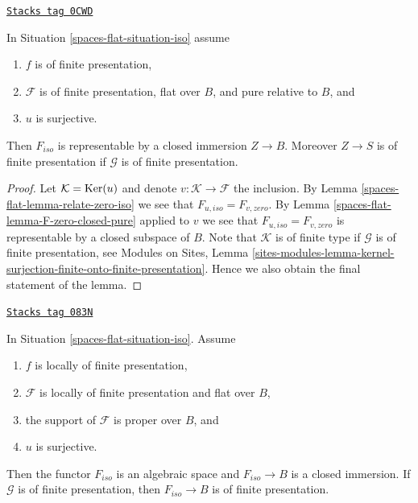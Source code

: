\begin{theorem}
\label{spaces-flat-theorem-flattening-map}
\href{https://stacks.math.columbia.edu/tag/0CWD}{\texttt{Stacks tag 0CWD}}

In Situation \ref{spaces-flat-situation-iso} assume
\begin{enumerate}
\item $f$ is of finite presentation,
\item $\mathcal{F}$ is of finite presentation, flat over $B$, and
pure relative to $B$, and
\item $u$ is surjective.
\end{enumerate}
Then $F_{iso}$ is representable by a closed immersion $Z \to B$.
Moreover $Z \to S$ is of finite presentation if $\mathcal{G}$ is
of finite presentation.
\end{theorem}

\begin{proof}
Let $\mathcal{K} = \operatorname{Ker}(u)$ and denote $v : \mathcal{K} \to \mathcal{F}$
the inclusion. By Lemma \ref{spaces-flat-lemma-relate-zero-iso} we see that
$F_{u, iso} = F_{v, zero}$. By Lemma \ref{spaces-flat-lemma-F-zero-closed-pure}
applied to $v$ we see that $F_{u, iso} = F_{v, zero}$ is representable
by a closed subspace of $B$. Note that $\mathcal{K}$ is of finite type
if $\mathcal{G}$ is of finite presentation, see
Modules on Sites, Lemma
\ref{sites-modules-lemma-kernel-surjection-finite-onto-finite-presentation}.
Hence we also obtain the final statement of the lemma.
\end{proof}

\begin{lemma}
\label{spaces-flat-lemma-F-iso-closed}
\href{https://stacks.math.columbia.edu/tag/083N}{\texttt{Stacks tag 083N}}

In Situation \ref{spaces-flat-situation-iso}. Assume
\begin{enumerate}
\item $f$ is locally of finite presentation,
\item $\mathcal{F}$ is locally of finite presentation and flat over $B$,
\item the support of $\mathcal{F}$ is proper over $B$, and
\item $u$ is surjective.
\end{enumerate}
Then the functor $F_{iso}$ is an algebraic space and $F_{iso} \to B$
is a closed immersion. If $\mathcal{G}$ is of finite presentation, then
$F_{iso} \to B$ is of finite presentation.
\end{lemma}

